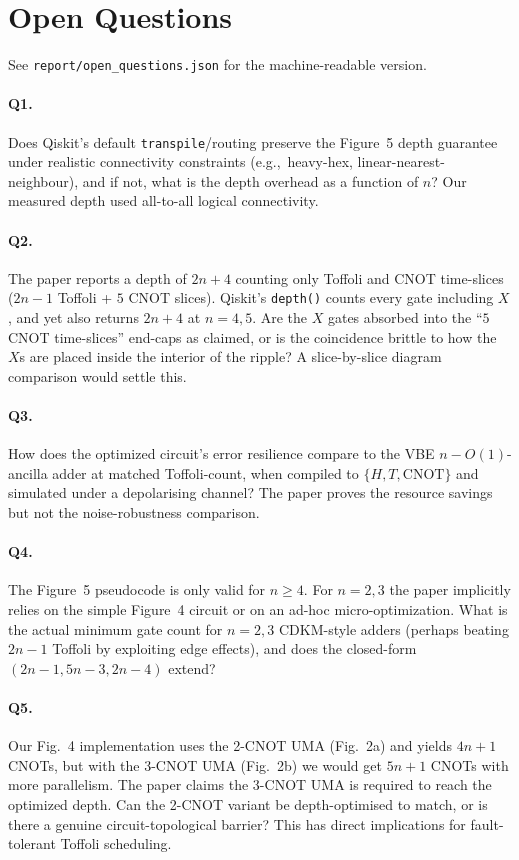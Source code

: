 \documentclass[11pt]{article}
\begin{document}
\section{Open Questions}

See \texttt{report/open\_questions.json} for the machine-readable version.

\paragraph{Q1.} Does Qiskit's default \texttt{transpile}/routing preserve the
Figure~5 depth guarantee under realistic connectivity constraints (e.g.,\
heavy-hex, linear-nearest-neighbour), and if not, what is the depth
overhead as a function of $n$? Our measured depth used all-to-all logical
connectivity.

\paragraph{Q2.} The paper reports a depth of $2n{+}4$ counting only Toffoli
and CNOT time-slices ($2n{-}1$ Toffoli + $5$ CNOT slices). Qiskit's
\texttt{depth()} counts every gate including $X$, and yet also returns
$2n{+}4$ at $n{=}4,5$. Are the $X$ gates absorbed into the ``$5$ CNOT
time-slices'' end-caps as claimed, or is the coincidence brittle to how the
$X$s are placed inside the interior of the ripple? A slice-by-slice diagram
comparison would settle this.

\paragraph{Q3.} How does the optimized circuit's error resilience compare to
the VBE $n{-}O(1)$-ancilla adder at matched Toffoli-count, when compiled to
$\{H,T,\text{CNOT}\}$ and simulated under a depolarising channel? The paper
proves the resource savings but not the noise-robustness comparison.

\paragraph{Q4.} The Figure~5 pseudocode is only valid for $n \ge 4$. For
$n{=}2,3$ the paper implicitly relies on the simple Figure~4 circuit or on
an ad-hoc micro-optimization. What is the actual minimum gate count for
$n{=}2,3$ CDKM-style adders (perhaps beating $2n{-}1$ Toffoli by exploiting
edge effects), and does the closed-form $(2n{-}1, 5n{-}3, 2n{-}4)$ extend?

\paragraph{Q5.} Our Fig.~4 implementation uses the 2-CNOT UMA (Fig.~2a) and
yields $4n{+}1$ CNOTs, but with the 3-CNOT UMA (Fig.~2b) we would get
$5n{+}1$ CNOTs with more parallelism. The paper claims the 3-CNOT UMA is
required to reach the optimized depth. Can the 2-CNOT variant be
depth-optimised to match, or is there a genuine circuit-topological barrier?
This has direct implications for fault-tolerant Toffoli scheduling.
\end{document}
